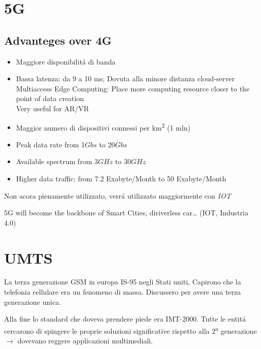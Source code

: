 \documentclass{article}
\begin{document}

\newpage

\section{5G}

\subsection{Advanteges over 4G}

\begin{itemize}
    \item Maggiore disponibilit\'a di banda
    \item Bassa latenza: da 9 a 10 ms; Dovuta alla minore distanza cloud-server\\
        Multiaccess Edge Computing: Place more computing resource closer to the point of data creation\\
        Very useful for AR/VR

    \item Maggior numero di dispositivi connessi per km\textsuperscript{2} (1 mln)
    \item Peak data rate from 1\(Gbs\) to 20\(Gbs\)
    \item Available spectrum from 3\(GHz\) to 30\(GHz\)
    \item Higher data traffic; from 7.2 Exabyte/Month to 50 Exabyte/Month

\end{itemize}


Non acora pienamente utilizzato, verr\'a utilizzato maggiormente con \textit{IOT}


5G will become the backbone of Smart Cities, diriverless car… (IOT, Industria 4.0)

\newpage
\section{UMTS}
La terza generazione GSM in europa IS-95 negli Stati uniti, Capirono che la telefonia cellulare era un fenomeno di massa.
Discussero per avere una terza generazione unica.

Alla fine lo standard che doveva prendere piede era IMT-2000. Tutte le entit\'a cercarono di spingere le proprie soluzioni significative rispetto alla 2\textsuperscript{a} generazione $\rightarrow$ dovevano reggere applicazioni multimediali.
\end{document}

